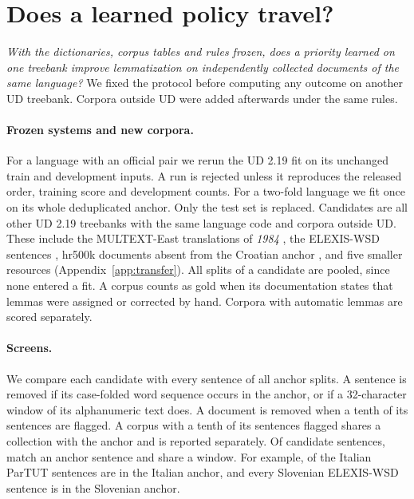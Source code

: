 \documentclass[11pt]{article}
\begin{document}
\section{Does a learned policy travel?}
\label{sec:transfer}

\emph{With the dictionaries, corpus tables and rules frozen, does a priority
learned on one treebank improve lemmatization on independently collected
documents of the same language?} We fixed the protocol before computing any
outcome on another UD treebank. Corpora outside UD were added afterwards
under the same rules.

\begin{table}[t]
\centering\small\setlength{\tabcolsep}{3pt}

\caption{Frozen declared and learned orders on corpora outside the anchor
treebank. The first row repeats the anchor test splits for the languages
with official fits. Declared is mean language accuracy. $\Delta$ is the
paired change in percentage points. Confirmed applies the learned order only
where anchor development data had accepted it. The last two rows are
excluded from all rows above them.}
\label{tab:transfer}
\end{table}

\paragraph{Frozen systems and new corpora.}
For a language with an official pair we rerun the UD 2.19 fit on its
unchanged train and development inputs. A run is rejected unless it
reproduces the released order, training score and development counts. For a
two-fold language we fit once on its whole deduplicated anchor. Only the
test set is replaced. Candidates are all other UD 2.19 treebanks with the same
language code and \trOutsideCandidates{} corpora outside UD. These include the MULTEXT-East
translations of \emph{1984} \citep{mte1984,erjavec-2012-multext}, the
ELEXIS-WSD sentences \citep{elexis-wsd,martelli-etal-2021-elexis}, hr500k
documents absent from the Croatian anchor
\citep{hr500k,ljubesic-etal-2018-hr500k}, and five smaller resources
(Appendix~\ref{app:transfer}).
All splits of a candidate are pooled, since none entered a fit. A corpus
counts as gold when its documentation states that lemmas were assigned or
corrected by hand. Corpora with automatic lemmas are scored separately.

\paragraph{Screens.}
We compare each candidate with every sentence of all anchor splits. A
sentence is removed if its case-folded word sequence occurs in the anchor,
or if a 32-character window of its alphanumeric text does. A document is
removed when a tenth of its sentences are flagged. A corpus with a tenth of
its sentences flagged shares a collection with the anchor and is reported
separately. Of \trSentRead{} candidate sentences, \trExact{} match an anchor
sentence and \trNear{} share a window. For example, \trParTUTExact{} of the
\trParTUTRead{} Italian ParTUT sentences are in the Italian anchor, and
every Slovenian ELEXIS-WSD sentence is in the Slovenian anchor.
\end{document}
